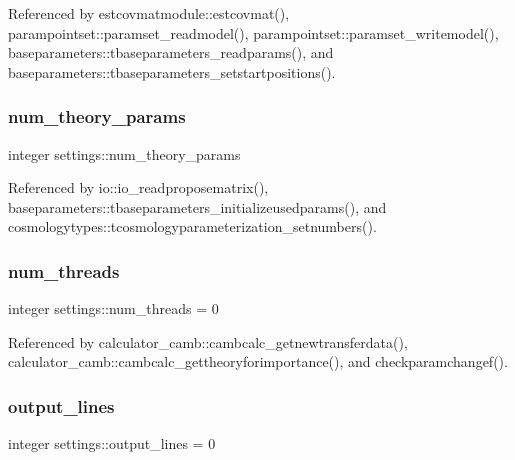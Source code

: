 Referenced by estcovmatmodule\+::estcovmat(), parampointset\+::paramset\+\_\+readmodel(), parampointset\+::paramset\+\_\+writemodel(), baseparameters\+::tbaseparameters\+\_\+readparams(), and baseparameters\+::tbaseparameters\+\_\+setstartpositions().

\mbox{\label{namespacesettings_a362078e6b11a6c4f0eff6aee65cf046a}} 
\subsubsection{\texorpdfstring{num\+\_\+theory\+\_\+params}{num\_theory\_params}}
{\footnotesize\ttfamily integer settings\+::num\+\_\+theory\+\_\+params}



Referenced by io\+::io\+\_\+readproposematrix(), baseparameters\+::tbaseparameters\+\_\+initializeusedparams(), and cosmologytypes\+::tcosmologyparameterization\+\_\+setnumbers().

\mbox{\label{namespacesettings_a004f5c3efc3e9d33a1a4526f5a20785b}} 
\subsubsection{\texorpdfstring{num\+\_\+threads}{num\_threads}}
{\footnotesize\ttfamily integer settings\+::num\+\_\+threads = 0}



Referenced by calculator\+\_\+camb\+::cambcalc\+\_\+getnewtransferdata(), calculator\+\_\+camb\+::cambcalc\+\_\+gettheoryforimportance(), and checkparamchangef().

\mbox{\label{namespacesettings_a8d398d8d6e0a5435eb847608d0147f12}} 
\subsubsection{\texorpdfstring{output\+\_\+lines}{output\_lines}}
{\footnotesize\ttfamily integer settings\+::output\+\_\+lines = 0}



